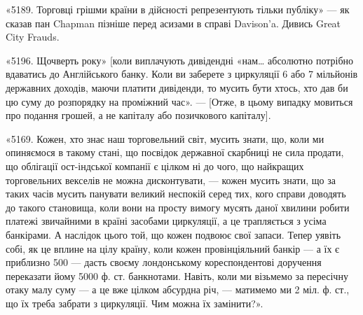 «5189. Торговці грішми країни в дійсності репрезентують тільки публіку»
— як сказав пан Chapman пізніше перед асизами в справі Davison’a.
Дивись Great City Frauds.

«5196. Щочверть року» [коли виплачують дивідендні «нам\dots{} абсолютно
потрібно вдаватись до Англійського банку. Коли ви заберете з циркуляції 6 або
7 мільйонів державних доходів, маючи платити дивіденди, то мусить бути хтось,
хто дав би цю суму до розпорядку на проміжний час». — [Отже, в цьому випадку
мовиться про подання грошей, а не капіталу або позичкового капіталу].

«5169. Кожен, хто знає наш торговельний світ, мусить знати, що, коли
ми опиняємося в такому стані, що посвідок державної скарбниці не сила продати,
що облігації ост-індської компанії є цілком ні до чого, що найкращих
торговельних векселів не можна дисконтувати, — кожен мусить знати, що за таких
часів мусить панувати великий неспокій серед тих, кого справи доводять до
такого становища, коли вони на просту вимогу мусять даної хвилини робити
платежі звичайними в країні засобами циркуляції, а це трапляється з усіма
банкірами. А наслідок цього той, що кожен подвоює свої запаси. Тепер уявіть
собі, як це вплине на цілу країну, коли кожен провінціяльний банкір — а їх є
приблизно 500 — дасть своєму лондонському кореспондентові доручення переказати
йому 5000 ф. ст. банкнотами. Навіть, коли ми візьмемо за пересічну
отаку малу суму — а це вже цілком абсурдна річ, — матимемо ми 2 міл. ф. ст.,
що їх треба забрати з циркуляції. Чим можна їх замінити?».
